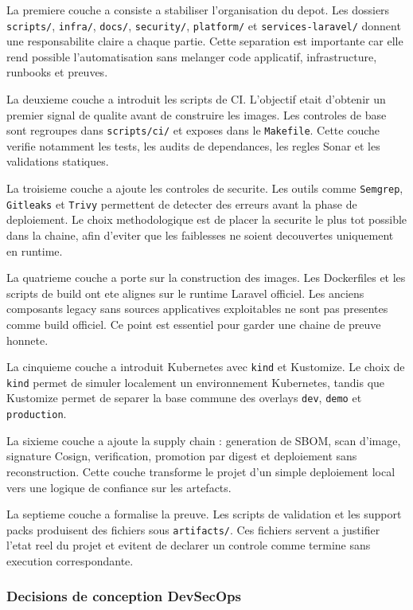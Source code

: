 La premiere couche a consiste a stabiliser l'organisation du depot. Les
dossiers \texttt{scripts/}, \texttt{infra/}, \texttt{docs/}, \texttt{security/},
\texttt{platform/} et \texttt{services-laravel/} donnent une responsabilite
claire a chaque partie. Cette separation est importante car elle rend possible
l'automatisation sans melanger code applicatif, infrastructure, runbooks et
preuves.

La deuxieme couche a introduit les scripts de CI. L'objectif etait d'obtenir un
premier signal de qualite avant de construire les images. Les controles de base
sont regroupes dans \texttt{scripts/ci/} et exposes dans le \texttt{Makefile}.
Cette couche verifie notamment les tests, les audits de dependances, les
regles Sonar et les validations statiques.

La troisieme couche a ajoute les controles de securite. Les outils comme
\texttt{Semgrep}, \texttt{Gitleaks} et \texttt{Trivy} permettent de detecter
des erreurs avant la phase de deploiement. Le choix methodologique est de
placer la securite le plus tot possible dans la chaine, afin d'eviter que les
faiblesses ne soient decouvertes uniquement en runtime.

La quatrieme couche a porte sur la construction des images. Les Dockerfiles et
les scripts de build ont ete alignes sur le runtime Laravel officiel. Les
anciens composants legacy sans sources applicatives exploitables ne sont pas
presentes comme build officiel. Ce point est essentiel pour garder une chaine
de preuve honnete.

La cinquieme couche a introduit Kubernetes avec \texttt{kind} et Kustomize. Le
choix de \texttt{kind} permet de simuler localement un environnement
Kubernetes, tandis que Kustomize permet de separer la base commune des overlays
\texttt{dev}, \texttt{demo} et \texttt{production}.

La sixieme couche a ajoute la supply chain : generation de SBOM, scan d'image,
signature Cosign, verification, promotion par digest et deploiement sans
reconstruction. Cette couche transforme le projet d'un simple deploiement local
vers une logique de confiance sur les artefacts.

La septieme couche a formalise la preuve. Les scripts de validation et les
support packs produisent des fichiers sous \texttt{artifacts/}. Ces fichiers
servent a justifier l'etat reel du projet et evitent de declarer un controle
comme termine sans execution correspondante.

\subsubsection{Decisions de conception DevSecOps}

